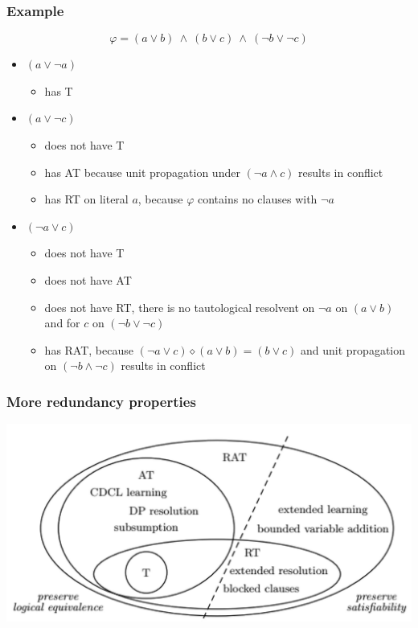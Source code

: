 \documentclass[xcolor=dvipsnames]{beamer}
\begin{document}
\begin{frame}[t]
    \frametitle{Example}
    \[
        \varphi = (a \vee b) ~\wedge~ (b \vee c) ~\wedge~ (\neg b \vee \neg c)
    \]
    \begin{itemize}
        \item $(a \vee \neg a)$
        \pause
        \begin{itemize}
                \item has T
        \end{itemize}
        \pause
        \item $(a \vee \neg c)$
        \pause
            \begin{itemize}[<+->]
            \item does not have T
            \item has AT because unit propagation under $(\neg a \wedge c)$ results in conflict
            \item has RT on literal $a$, because $\varphi$ contains no clauses with $\neg a$
        \end{itemize}
        \pause
        \item $(\neg a \vee c)$
        \pause
        \begin{itemize}[<+->]
                \item does not have T
                \item does not have AT
                \item does not have RT, there is no tautological resolvent on $\neg a$
                      on $(a \vee b)$ and for $c$ on $(\neg b \vee \neg c)$
                \item has RAT, because $(\neg a \vee c) \diamond (a \vee b) = (b \vee c)$ and
                      unit propagation on $(\neg b \wedge \neg c)$ results in conflict
        \end{itemize}
    \end{itemize}
\end{frame}

\begin{frame}
	\frametitle{More redundancy properties}
    \begin{center}
        \includegraphics[width=\textwidth,height=0.8\textheight,keepaspectratio]{rat.jpg}
    \end{center}
\end{frame}
\end{document}
